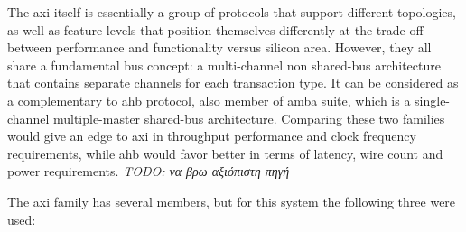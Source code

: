 \label{amba}
The \gls{axi} itself is essentially a group of protocols that support different topologies,
as well as feature levels that position themselves differently at the trade-off
between performance and functionality versus silicon area.
However, they all share a fundamental bus concept:
a multi-channel non shared-bus architecture that contains separate
channels for each \gls{transaction} type. It can be considered as a complementary
to \gls{ahb} protocol, also member of \gls{amba} suite,
which is a single-channel multiple-master shared-bus architecture.
Comparing these two families would give an edge to \gls{axi} in
throughput performance and clock frequency requirements, while \gls{ahb} would favor
better in terms of latency, wire count and power requirements.
\emph{TODO: να βρω αξιόπιστη πηγή}

The \gls{axi} family has several members, but for this system the following three were used:
